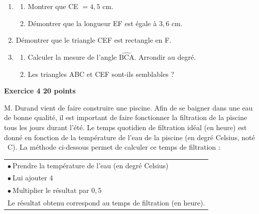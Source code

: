 \documentclass[11pt]{article}
\begin{document}
\medskip

\begin{enumerate}
\item
	\begin{enumerate}
		\item Montrer que CE $= 4,5$ cm.
		\item Démontrer que la longueur EF est égale à $3,6$ cm.
	\end{enumerate}
\item Démontrer que le triangle CEF est rectangle en F.
\item
	\begin{enumerate}
		\item Calculer la mesure de l'angle $\widehat{\text{BCA}}$. Arrondir au degré.
		\item Les triangles ABC et CEF sont-ils semblables ?
	\end{enumerate}
\end{enumerate}

\bigskip

\textbf{Exercice 4 \hfill 20 points}

\medskip

M. Durand vient de faire construire une piscine. Afin de se baigner dans une eau de bonne qualité, il est important de faire fonctionner la filtration de la piscine tous les jours durant l'été. Le temps quotidien de filtration idéal (en heure) est donné en fonction de la température de l'eau de la piscine (en degré Celsius, noté \degres~C). La méthode ci-dessous permet de calculer ce temps de filtration :

\begin{center}
\begin{tabularx}{0.67\linewidth}{|X|}\hline
$\bullet~$Prendre la température de l'eau (en degré Celsius)\\
$\bullet~$Lui ajouter $4$\\
$\bullet~$Multiplier le résultat par $0,5$\\

Le résultat obtenu correspond au temps de filtration (en heure).\\ \hline
\end{tabularx}
\end{center}
\end{document}
